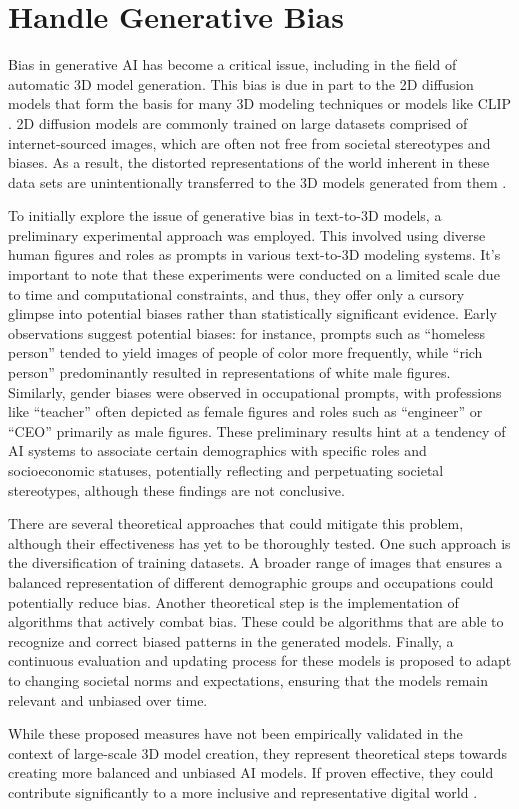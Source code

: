 \section{Handle Generative Bias}

Bias in generative AI has become a critical issue, including in the field of automatic 3D model generation. This bias is due in part to the 2D diffusion models that form the basis for many 3D modeling techniques or models like CLIP \citep{luccioni2023stable,radfordCLIP}. 2D diffusion models are commonly trained on large datasets comprised of internet-sourced images, which are often not free from societal stereotypes and biases. As a result, the distorted representations of the world inherent in these data sets are unintentionally transferred to the 3D models generated from them \citep{buolamwini2018gender}.

To initially explore the issue of generative bias in text-to-3D models, a preliminary experimental approach was employed. This involved using diverse human figures and roles as prompts in various text-to-3D modeling systems. It's important to note that these experiments were conducted on a limited scale due to time and computational constraints, and thus, they offer only a cursory glimpse into potential biases rather than statistically significant evidence. Early observations suggest potential biases: for instance, prompts such as ``homeless person'' tended to yield images of people of color more frequently, while ``rich person'' predominantly resulted in representations of white male figures. Similarly, gender biases were observed in occupational prompts, with professions like ``teacher'' often depicted as female figures and roles such as ``engineer'' or ``CEO'' primarily as male figures. These preliminary results hint at a tendency of AI systems to associate certain demographics with specific roles and socioeconomic statuses, potentially reflecting and perpetuating societal stereotypes, although these findings are not conclusive.

There are several theoretical approaches that could mitigate this problem, although their effectiveness has yet to be thoroughly tested. One such approach is the diversification of training datasets. A broader range of images that ensures a balanced representation of different demographic groups and occupations could potentially reduce bias. Another theoretical step is the implementation of algorithms that actively combat bias. These could be algorithms that are able to recognize and correct biased patterns in the generated models.  Finally, a continuous evaluation and updating process for these models is proposed to adapt to changing societal norms and expectations, ensuring that the models remain relevant and unbiased over time.

While these proposed measures have not been empirically validated in the context of large-scale 3D model creation, they represent theoretical steps towards creating more balanced and unbiased AI models. If proven effective, they could contribute significantly to a more inclusive and representative digital world \citep{luccioni2023stable}.